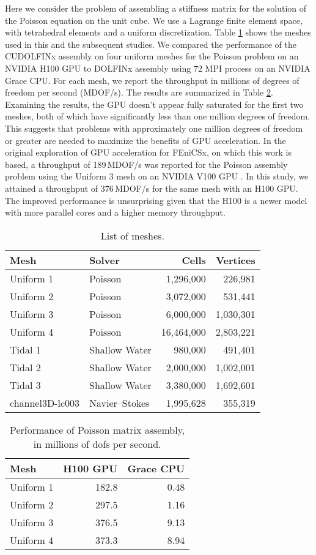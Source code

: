 Here we consider the problem of assembling a stiffness matrix for the solution of the Poisson equation on the unit cube. We use a Lagrange finite element space, with tetrahedral elements and a uniform discretization. Table \ref{tab:meshes} shows the meshes used in this and the subsequent studies. We compared the performance of the CUDOLFINx assembly on four uniform meshes for the Poisson problem on an NVIDIA H100 GPU to DOLFINx assembly using 72 MPI process on an NVIDIA Grace CPU. For each mesh, we report the throughput in millions of degrees of freedom per second (MDOF/s). The results are summarized in Table \ref{tab:poisson_results}. Examining the results, the GPU doesn't appear fully saturated for the first two meshes, both of which have significantly less than one million degrees of freedom. This suggests that problems with approximately one million degrees of freedom or greater are needed to maximize the benefits of GPU acceleration. In the original exploration of GPU acceleration for FEniCSx, on which this work is based, a throughput of 189\,MDOF/s was reported for the Poisson assembly problem using the Uniform 3 mesh on an NVIDIA V100 GPU \citep{trotter2023targeting}. In this study, we attained a throughput of 376\,MDOF/s for the same mesh with an H100 GPU. The improved performance is unsurprising given that the H100 is a newer model with more parallel cores and a higher memory throughput.
\begin{table}[t]
    \centering
\begin{tabular}{llrr}
\toprule
Mesh & Solver & Cells & Vertices\\
\midrule
Uniform 1 & Poisson & 1,296,000 & 226,981 \\
Uniform 2 & Poisson & 3,072,000 & 531,441 \\
Uniform 3 & Poisson & 6,000,000 & 1,030,301 \\
Uniform 4 & Poisson & 16,464,000 & 2,803,221 \\
Tidal 1 & Shallow Water & 980,000 & 491,401 \\
Tidal 2 & Shallow Water & 2,000,000 & 1,002,001 \\
Tidal 3 & Shallow Water & 3,380,000 & 1,692,601 \\
channel3D-lc003 & Navier--Stokes & 1,995,628 & 355,319 \\
\bottomrule
\end{tabular}
\caption{List of meshes.}
    \label{tab:meshes}
\end{table}

\begin{table}[t]
    \centering
\begin{tabular}{lrr}
\toprule
Mesh & H100 GPU & Grace CPU \\
\midrule
Uniform 1 & 182.8 & 0.48 \\
Uniform 2 & 297.5 & 1.16 \\
Uniform 3 & 376.5 & 9.13 \\
Uniform 4 & 373.3 & 8.94 \\
\bottomrule
\end{tabular}
\caption{Performance of Poisson matrix assembly, in millions of dofs per second.}
    \label{tab:poisson_results}
\end{table}

